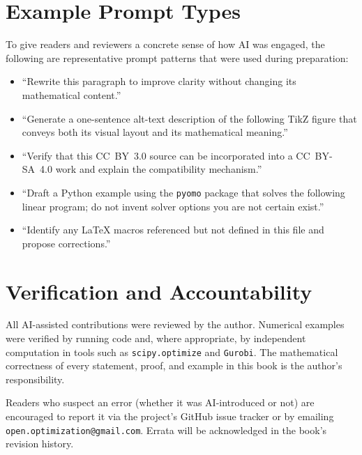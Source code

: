 \section*{Example Prompt Types}

To give readers and reviewers a concrete sense of how AI was engaged,
the following are representative prompt patterns that were used during
preparation:

\begin{itemize}
  \item ``Rewrite this paragraph to improve clarity without changing
    its mathematical content.''
  \item ``Generate a one-sentence alt-text description of the
    following TikZ figure that conveys both its visual layout and its
    mathematical meaning.''
  \item ``Verify that this CC~BY~3.0 source can be incorporated into a
    CC~BY-SA~4.0 work and explain the compatibility mechanism.''
  \item ``Draft a Python example using the \texttt{pyomo} package that
    solves the following linear program; do not invent solver options
    you are not certain exist.''
  \item ``Identify any LaTeX macros referenced but not defined in this
    file and propose corrections.''
\end{itemize}

\section*{Verification and Accountability}

All AI-assisted contributions were reviewed by the author. Numerical
examples were verified by running code and, where appropriate, by
independent computation in tools such as \texttt{scipy.optimize} and
\texttt{Gurobi}. The mathematical correctness of every statement,
proof, and example in this book is the author's responsibility.

Readers who suspect an error (whether it was AI-introduced or not)
are encouraged to report it via the project's GitHub issue
tracker or by emailing \texttt{open.optimization@gmail.com}. Errata
will be acknowledged in the book's revision history.

